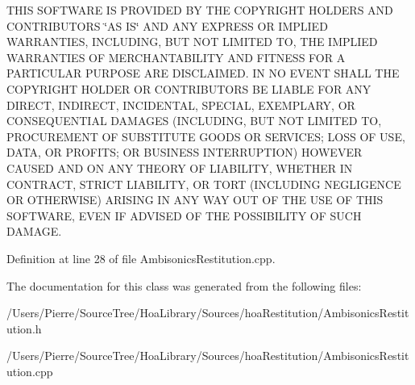 T\-H\-I\-S S\-O\-F\-T\-W\-A\-R\-E I\-S P\-R\-O\-V\-I\-D\-E\-D B\-Y T\-H\-E C\-O\-P\-Y\-R\-I\-G\-H\-T H\-O\-L\-D\-E\-R\-S A\-N\-D C\-O\-N\-T\-R\-I\-B\-U\-T\-O\-R\-S \char`\"{}\-A\-S I\-S\char`\"{} A\-N\-D A\-N\-Y E\-X\-P\-R\-E\-S\-S O\-R I\-M\-P\-L\-I\-E\-D W\-A\-R\-R\-A\-N\-T\-I\-E\-S, I\-N\-C\-L\-U\-D\-I\-N\-G, B\-U\-T N\-O\-T L\-I\-M\-I\-T\-E\-D T\-O, T\-H\-E I\-M\-P\-L\-I\-E\-D W\-A\-R\-R\-A\-N\-T\-I\-E\-S O\-F M\-E\-R\-C\-H\-A\-N\-T\-A\-B\-I\-L\-I\-T\-Y A\-N\-D F\-I\-T\-N\-E\-S\-S F\-O\-R A P\-A\-R\-T\-I\-C\-U\-L\-A\-R P\-U\-R\-P\-O\-S\-E A\-R\-E D\-I\-S\-C\-L\-A\-I\-M\-E\-D. I\-N N\-O E\-V\-E\-N\-T S\-H\-A\-L\-L T\-H\-E C\-O\-P\-Y\-R\-I\-G\-H\-T H\-O\-L\-D\-E\-R O\-R C\-O\-N\-T\-R\-I\-B\-U\-T\-O\-R\-S B\-E L\-I\-A\-B\-L\-E F\-O\-R A\-N\-Y D\-I\-R\-E\-C\-T, I\-N\-D\-I\-R\-E\-C\-T, I\-N\-C\-I\-D\-E\-N\-T\-A\-L, S\-P\-E\-C\-I\-A\-L, E\-X\-E\-M\-P\-L\-A\-R\-Y, O\-R C\-O\-N\-S\-E\-Q\-U\-E\-N\-T\-I\-A\-L D\-A\-M\-A\-G\-E\-S (I\-N\-C\-L\-U\-D\-I\-N\-G, B\-U\-T N\-O\-T L\-I\-M\-I\-T\-E\-D T\-O, P\-R\-O\-C\-U\-R\-E\-M\-E\-N\-T O\-F S\-U\-B\-S\-T\-I\-T\-U\-T\-E G\-O\-O\-D\-S O\-R S\-E\-R\-V\-I\-C\-E\-S; L\-O\-S\-S O\-F U\-S\-E, D\-A\-T\-A, O\-R P\-R\-O\-F\-I\-T\-S; O\-R B\-U\-S\-I\-N\-E\-S\-S I\-N\-T\-E\-R\-R\-U\-P\-T\-I\-O\-N) H\-O\-W\-E\-V\-E\-R C\-A\-U\-S\-E\-D A\-N\-D O\-N A\-N\-Y T\-H\-E\-O\-R\-Y O\-F L\-I\-A\-B\-I\-L\-I\-T\-Y, W\-H\-E\-T\-H\-E\-R I\-N C\-O\-N\-T\-R\-A\-C\-T, S\-T\-R\-I\-C\-T L\-I\-A\-B\-I\-L\-I\-T\-Y, O\-R T\-O\-R\-T (I\-N\-C\-L\-U\-D\-I\-N\-G N\-E\-G\-L\-I\-G\-E\-N\-C\-E O\-R O\-T\-H\-E\-R\-W\-I\-S\-E) A\-R\-I\-S\-I\-N\-G I\-N A\-N\-Y W\-A\-Y O\-U\-T O\-F T\-H\-E U\-S\-E O\-F T\-H\-I\-S S\-O\-F\-T\-W\-A\-R\-E, E\-V\-E\-N I\-F A\-D\-V\-I\-S\-E\-D O\-F T\-H\-E P\-O\-S\-S\-I\-B\-I\-L\-I\-T\-Y O\-F S\-U\-C\-H D\-A\-M\-A\-G\-E. 

Definition at line 28 of file Ambisonics\-Restitution.\-cpp.



The documentation for this class was generated from the following files\-:\begin{DoxyCompactItemize}
\item 
/\-Users/\-Pierre/\-Source\-Tree/\-Hoa\-Library/\-Sources/hoa\-Restitution/Ambisonics\-Restitution.\-h\item 
/\-Users/\-Pierre/\-Source\-Tree/\-Hoa\-Library/\-Sources/hoa\-Restitution/Ambisonics\-Restitution.\-cpp\end{DoxyCompactItemize}
